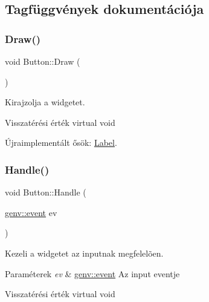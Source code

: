 \subsection{Tagfüggvények dokumentációja}
\mbox{\label{class_button_a6aaa2b781c933a296f41a8eca890eb1f}} 
\subsubsection{\texorpdfstring{Draw()}{Draw()}}
{\footnotesize\ttfamily void Button\+::\+Draw (\begin{DoxyParamCaption}{ }\end{DoxyParamCaption})\hspace{0.3cm}{\ttfamily [virtual]}}



Kirajzolja a widgetet. 

\begin{DoxyReturn}{Visszatérési érték}
virtual void 
\end{DoxyReturn}


Újraimplementált ősök\+: \hyperlink{class_label_a184df028b3aa8c7f8dec8ecb90533319}{Label}.

\mbox{\label{class_button_a72dc68b7a78edfebe904bf489d6e03fb}} 
\subsubsection{\texorpdfstring{Handle()}{Handle()}}
{\footnotesize\ttfamily void Button\+::\+Handle (\begin{DoxyParamCaption}\item[{\hyperlink{structgenv_1_1event}{genv\+::event}}]{ev }\end{DoxyParamCaption})\hspace{0.3cm}{\ttfamily [virtual]}}



Kezeli a widgetet az inputnak megfelelõen. 


\begin{DoxyParams}{Paraméterek}
{\em ev} & \hyperlink{structgenv_1_1event}{genv\+::event} Az input eventje \\
\hline
\end{DoxyParams}
\begin{DoxyReturn}{Visszatérési érték}
virtual void 
\end{DoxyReturn}


